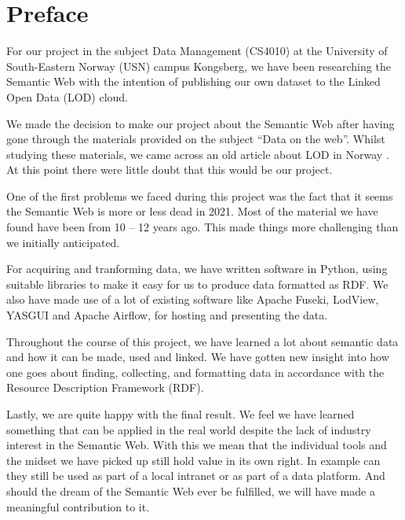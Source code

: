 \chapter*{Preface}

For our project in the subject Data Management (CS4010) at the University of South-Eastern Norway (USN) campus Kongsberg, we have been researching the Semantic Web with the intention of publishing our own dataset to the Linked Open Data (LOD) cloud.

\vspace{5mm}


We made the decision to make our project about the Semantic Web after having gone through the materials provided on the subject “Data on the web”. Whilst studying these materials, we came across an old article about LOD in Norway \cite{semicolon-ii}. At this point there were little doubt that this would be our project.

\vspace{5mm}

One of the first problems we faced during this project was the fact that it seems the Semantic Web is more or less dead in 2021. Most of the material we have found have been from 10 – 12 years ago. This made things more challenging than we initially anticipated. 

\vspace{5mm}

For acquiring and tranforming data, we have written software in Python, using suitable libraries to make it easy for us to produce data formatted as RDF. We also have made use of a lot of existing software like Apache Fuseki, LodView, YASGUI and Apache Airflow, for hosting and presenting the data.

\vspace{5mm}

Throughout the course of this project, we have learned a lot about semantic data and how it can be made, used and linked. We have gotten new insight into how one goes about finding, collecting, and formatting data in accordance with the  Resource Description Framework (RDF).

\vspace{5mm}

Lastly, we are quite happy with the final result. We feel we have learned something that can be applied in the real world despite the lack of industry interest in the Semantic Web. With this we mean that the individual tools and the midset we have picked up still hold value in its own right. In example can they still be used as part of a local intranet or as part of a data platform. And should the dream of the Semantic Web ever be fulfilled, we will have made a meaningful contribution to it.



